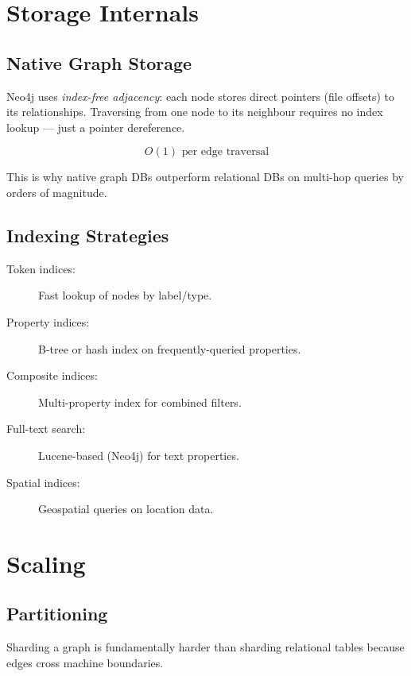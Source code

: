 \documentclass[11pt,a4paper,oneside,openany]{book}
\theoremstyle{definition}
\theoremstyle{plain}
\theoremstyle{remark}
\begin{document}
\section{Storage Internals}\label{sec:storage-internals}

\subsection{Native Graph Storage}

Neo4j uses \emph{index-free adjacency}: each node stores direct pointers (file offsets) to its relationships. Traversing from one node to its neighbour requires no index lookup --- just a pointer dereference.

$$O(1) \text{ per edge traversal}$$

This is why native graph DBs outperform relational DBs on multi-hop queries by orders of magnitude.

\subsection{Indexing Strategies}

\begin{description}
	\item[Token indices:] Fast lookup of nodes by label/type.
	\item[Property indices:] B-tree or hash index on frequently-queried properties.
	\item[Composite indices:] Multi-property index for combined filters.
	\item[Full-text search:] Lucene-based (Neo4j) for text properties.
	\item[Spatial indices:] Geospatial queries on location data.
\end{description}

\section{Scaling}\label{sec:scaling}

\subsection{Partitioning}

Sharding a graph is fundamentally harder than sharding relational tables because edges cross machine boundaries.
\end{document}
